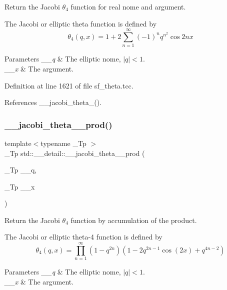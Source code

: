 Return the Jacobi $ \theta_4 $ function for real nome and argument.

The Jacobi or elliptic theta function is defined by \[ \theta_4(q,x) = 1 + 2\sum_{n=1}^{\infty}(-1)^n q^{n^2}\cos{2nx} \]


\begin{DoxyParams}{Parameters}
{\em \+\_\+\+\_\+q} & The elliptic nome, $ |q| < 1 $. \\
\hline
{\em \+\_\+\+\_\+x} & The argument. \\
\hline
\end{DoxyParams}


Definition at line 1621 of file sf\+\_\+theta.\+tcc.



References \+\_\+\+\_\+jacobi\+\_\+theta\+\_().

\mbox{\label{namespacestd_1_1____detail_a577345a46215dd84c03eb4c760dbf7f4}} 
\subsubsection{\texorpdfstring{\+\_\+\+\_\+jacobi\+\_\+theta\+\_\+\_\+prod()}{\_\_jacobi\_theta\_4\_prod()}}
{\footnotesize\ttfamily template$<$typename \+\_\+\+Tp $>$ \\
\+\_\+\+Tp std\+::\+\_\+\+\_\+detail\+::\+\_\+\+\_\+jacobi\+\_\+theta\+\_\+\_\+prod (\begin{DoxyParamCaption}\item[{\+\_\+\+Tp}]{\+\_\+\+\_\+q,  }\item[{\+\_\+\+Tp}]{\+\_\+\+\_\+x }\end{DoxyParamCaption})}

Return the Jacobi $ \theta_4 $ function by accumulation of the product.

The Jacobi or elliptic theta-\/4 function is defined by \[ \theta_4(q,x) = \prod_{n=1}^{\infty} (1 - q^{2n})(1 - 2q^{2n-1}\cos(2x) + q^{4n-2}) \]


\begin{DoxyParams}{Parameters}
{\em \+\_\+\+\_\+q} & The elliptic nome, $ |q| < 1 $. \\
\hline
{\em \+\_\+\+\_\+x} & The argument. \\
\hline
\end{DoxyParams}



